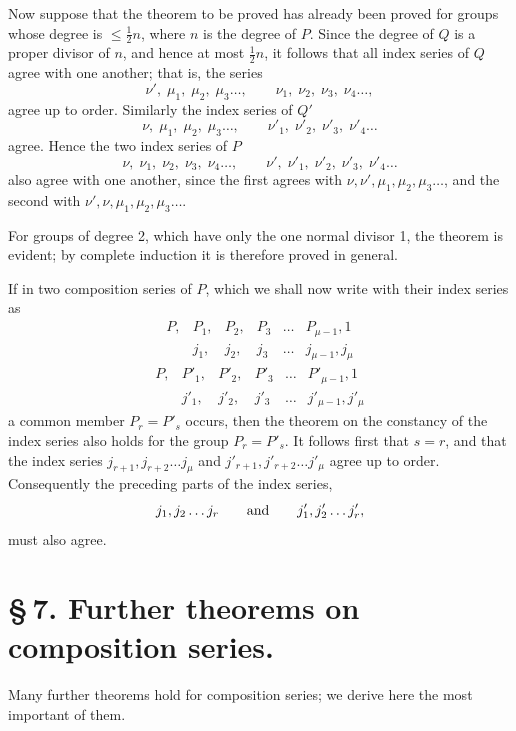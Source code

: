 \documentclass[11pt]{article}
\begin{document}
Now suppose that the theorem to be proved has already been proved for groups whose degree is $\leq \frac12 n$, where $n$ is the degree of $P$. Since the degree of $Q$ is a proper divisor of $n$, and hence at most $\frac12n$, it follows that all index series of $Q$ agree with one another; that is, the series
\[
\nu',\;\mu_1,\;\mu_2,\;\mu_3\ldots,
\qquad
\nu_1,\;\nu_2,\;\nu_3,\;\nu_4\ldots,
\]
agree up to order. Similarly the index series of $Q'$
\[
\nu,\;\mu_1,\;\mu_2,\;\mu_3\ldots,
\qquad
\nu'_1,\;\nu'_2,\;\nu'_3,\;\nu'_4\ldots
\]
agree. Hence the two index series of $P$
\[
\nu,\;\nu_1,\;\nu_2,\;\nu_3,\;\nu_4\ldots,
\qquad
\nu',\;\nu'_1,\;\nu'_2,\;\nu'_3,\;\nu'_4\ldots
\]
also agree with one another, since the first agrees with $\nu,\nu',\mu_1,\mu_2,\mu_3\ldots$, and the second with $\nu',\nu,\mu_1,\mu_2,\mu_3\ldots$.

For groups of degree 2, which have only the one normal divisor 1, the theorem is evident; by complete induction it is therefore proved in general.

If in two composition series of $P$, which we shall now write with their index series as
\begin{equation}
\begin{array}{cccccc}
P,&P_1,&P_2,&P_3&\ldots&P_{\mu-1},1\\
&j_1,&j_2,&j_3&\ldots&j_{\mu-1},j_\mu
\end{array}
\tag{28}
\end{equation}
\begin{equation}
\begin{array}{cccccc}
P,&P'_1,&P'_2,&P'_3&\ldots&P'_{\mu-1},1\\
&j'_1,&j'_2,&j'_3&\ldots&j'_{\mu-1},j'_\mu
\end{array}
\tag{29}
\end{equation}
a common member $P_r=P'_s$ occurs, then the theorem on the constancy of the index series also holds for the group $P_r=P'_s$. It follows first that $s=r$, and that the index series $j_{r+1},j_{r+2}\ldots j_\mu$ and $j'_{r+1},j'_{r+2}\ldots j'_\mu$ agree up to order. Consequently the preceding parts of the index series,
\[
j_1,j_2\ldots j_r
\qquad\hbox{and}\qquad
j'_1,j'_2\ldots j'_r,
\]
must also agree.

\section*{\S\,7. Further theorems on composition series.}

Many further theorems hold for composition series; we derive here the most important of them.
\end{document}
